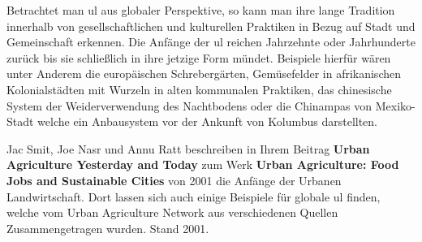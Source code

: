 \documentclass{scrartcl}
\begin{document}
Betrachtet man \acs{ul} aus globaler Perspektive, so kann man ihre lange Tradition innerhalb von gesellschaftlichen und kulturellen Praktiken in Bezug auf Stadt und Gemeinschaft erkennen. Die Anfänge der \acs{ul} reichen Jahrzehnte oder Jahrhunderte zurück bis sie schließlich in ihre jetzige Form mündet. Beispiele hierfür wären unter Anderem die europäischen Schrebergärten, Gemüsefelder in afrikanischen Kolonialstädten mit Wurzeln in alten kommunalen Praktiken, das chinesische System der Weiderverwendung des Nachtbodens oder die Chinampas von Mexiko-Stadt welche ein Anbausystem vor der Ankunft von Kolumbus darstellten.

Jac Smit, Joe Nasr und Annu Ratt beschreiben in Ihrem Beitrag \textbf{Urban Agriculture Yesterday and Today} zum Werk \textbf{Urban Agriculture: Food Jobs and Sustainable Cities} von 2001 die Anfänge der Urbanen Landwirtschaft. Dort lassen sich auch einige Beispiele für globale \acs{ul} finden, welche vom Urban Agriculture Network aus verschiedenen Quellen Zusammengetragen wurden. Stand 2001.
\end{document}
